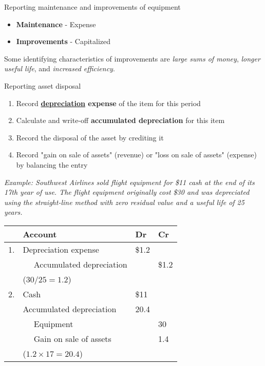 \label{subsec:equipments}

\begin{theorem}
    {Reporting maintenance and improvements of equipment}
    \begin{itemize}
        \item \textbf{Maintenance} - Expense
        \item \textbf{Improvements} - Capitalized
    \end{itemize}
    Some identifying characteristics of improvements are \textit{large sums of money}, \textit{longer useful life}, and \textit{increased efficiency}.
\end{theorem}

\begin{theorem}
    {Reporting asset disposal}
    \begin{enumerate}
        \item Record \textbf{\hyperref[subsec:depreciation]{depreciation} expense} of the item for this period
        \item Calculate and write-off \textbf{accumulated depreciation} for this item
        \item Record the disposal of the asset by crediting it
        \item Record "gain on sale of assets" (revenue) or "loss on sale of assets" (expense) by balancing the entry
    \end{enumerate}
    \tcblower
    \textit{Example: Southwest Airlines sold flight equipment for \$11 cash at the end of its 17th year of use. The flight equipment originally cost \$30 and was depreciated using the straight-line method with zero residual value and a useful life of 25 years.}

    \begin{tabular}{llll}
           & \textbf{Account}                 & \textbf{Dr} & \textbf{Cr} \\
        \hline
        1. & Depreciation expense             & \$1.2       &             \\
           & $\quad$ Accumulated depreciation &             & \$1.2       \\
           & (${30}/{25}=1.2$)                &             &             \\
        \hline
        2. & Cash                             & \$11        &             \\
           & Accumulated depreciation         & 20.4        &             \\
           & $\quad$ Equipment                &             & 30          \\
           & $\quad$ Gain on sale of assets   &             & 1.4         \\
           & ($1.2 \times 17=20.4$)           &             &             \\
    \end{tabular}
\end{theorem}
\label{subsec:asset_disposal}

